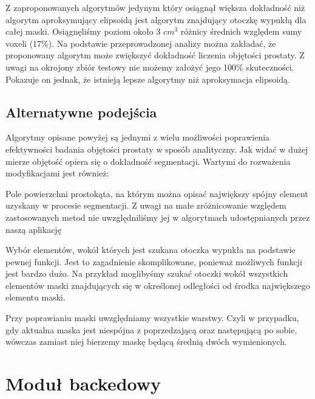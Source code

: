\documentclass[a4paper,11pt,twoside]{report}
\theoremstyle{definition}
\begin{document}
Z zaproponowanych algorytmów jedynym który osiągnął większa dokładność niż algorytm aproksymujący elipsoidą jest algorytm znajdujący otoczkę wypukłą dla całej maski. Osiągnęliśmy poziom około 3 $cm^3$  różnicy średnich względem sumy voxeli (17\%). Na podstawie przeprowadzonej analizy można zakładać, że proponowany algorytm może zwiększyć dokładność liczenia objętości prostaty. Z uwagi na okrojony zbiór testowy nie możemy założyć jego 100\% skuteczności. Pokazuje on jednak, że istnieją lepsze algorytmy niż aproksymacja elipsoidą.

\subsection{Alternatywne podejścia}
Algorytmy opisane powyżej są jednymi z wielu możliwości poprawienia efektywności badania objętości prostaty w sposób analityczny. Jak widać w dużej mierze objętość opiera się o dokładność segmentacji. Wartymi do rozważenia modyfikacjami jest również:
\begin{description}
\item Pole powierzchni prostokąta, na którym można opisać największy spójny element uzyskany w procesie segmentacji. Z uwagi na małe zróżnicowanie względem zastosowanych metod nie uwzględniliśmy jej w algorytmach udostępnianych przez naszą aplikację
\item Wybór elementów, wokół których jest szukana  otoczka wypukła na podstawie pewnej funkcji. Jest to zagadnienie skomplikowane, ponieważ możliwych funkcji jest bardzo dużo. Na przykład moglibyśmy szukać otoczki wokół wszystkich elementów maski znajdujących się w określonej odległości od środka największego elementu maski.
\item Przy poprawianiu maski uwzględniamy wszystkie warstwy. Czyli w przypadku, gdy aktualna maska jest niespójna z poprzedzającą oraz następującą po sobie, wówczas zamiast niej bierzemy maskę będącą średnią dwóch wymienionych.
\end{description}

\section{Moduł backedowy}
\end{document}
